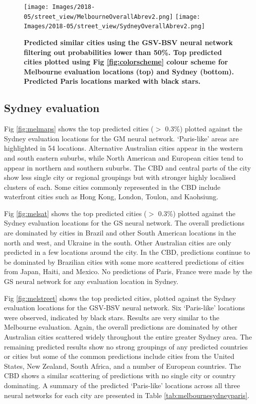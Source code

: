 \documentclass[Crown,sageh,times]{sagej}
\begin{document}
\begin{figure}[!htbp]
\centering   
\texttt{[image: Images/2018-05/street\_view/MelbourneOverallAbrev2.png]} 
\texttt{[image: Images/2018-05/street\_view/SydneyOverallAbrev2.png]}  
\caption{  \bf Predicted similar cities using the GSV-BSV neural network filtering out probabilities lower than 50\%. Top predicted cities plotted using Fig \ref{fig:colorscheme} colour scheme for Melbourne evaluation locations (top) and Sydney (bottom). Predicted Paris locations marked with black stars.}    
 \label{fig:melstreet2}  
\end{figure} 

\subsection{Sydney evaluation} 

Fig \ref{fig:melmaps} shows the top predicted cities ($>$ 0.3\%) plotted against the Sydney evaluation locations for the GM neural network. `Paris-like' areas are highlighted in 54 locations.  Alternative Australian cities appear in the western and south eastern suburbs, while North American and European cities tend to appear in northern and southern suburbs. The CBD and central parts of the city show less single city or regional groupings but with stronger highly localised clusters of each. Some cities commonly represented in the CBD include waterfront cities such as Hong Kong, London, Toulon, and Kaohsiung. 

Fig \ref{fig:melsat} shows the top predicted cities ($>$ 0.3\%) plotted against the Sydney evaluation locations for the GS neural network. The overall predictions are dominated by cities in Brazil and other South American locations in the north and west, and Ukraine in the south. Other Australian cities are only predicted in a few locations around the city. In the CBD, predictions continue to be dominated by Brazilian cities with some more scattered predictions of cities from Japan, Haiti, and Mexico. No predictions of Paris, France were made by the GS neural network for any evaluation location in Sydney.

Fig \ref{fig:melstreet} shows the top predicted cities, plotted against the Sydney evaluation locations for the GSV-BSV neural network. Six `Paris-like' locations were observed, indicated by black stars. Results are very similar to the Melbourne evaluation. Again, the overall predictions are dominated by other Australian cities scattered widely throughout the entire greater Sydney area. The remaining predicted results show no strong groupings of any predicted countries or cities but some of the common predictions include cities from the United States, New Zealand, South Africa, and a number of European countries. The CBD shows a similar scattering of predictions with no single city or country dominating. A summary of the predicted `Paris-like' locations across all three neural networks for each city are presented in Table \ref{tab:melbournesydneyparis}.
\end{document}
